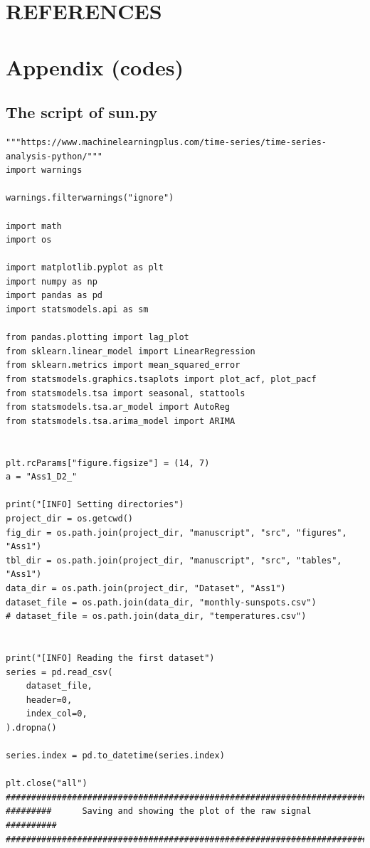 \documentclass[12pt]{article}
\begin{document}
\newpage
\section*{REFERENCES}
\label{sec:sec6}
\printbibliography[heading=none]

%


\newpage
\section*{Appendix (codes)}
\subsection*{The script of sun.py}

\begin{lstlisting}
"""https://www.machinelearningplus.com/time-series/time-series-analysis-python/"""
import warnings

warnings.filterwarnings("ignore")

import math
import os

import matplotlib.pyplot as plt
import numpy as np
import pandas as pd
import statsmodels.api as sm

from pandas.plotting import lag_plot
from sklearn.linear_model import LinearRegression
from sklearn.metrics import mean_squared_error
from statsmodels.graphics.tsaplots import plot_acf, plot_pacf
from statsmodels.tsa import seasonal, stattools
from statsmodels.tsa.ar_model import AutoReg
from statsmodels.tsa.arima_model import ARIMA


plt.rcParams["figure.figsize"] = (14, 7)
a = "Ass1_D2_"

print("[INFO] Setting directories")
project_dir = os.getcwd()
fig_dir = os.path.join(project_dir, "manuscript", "src", "figures", "Ass1")
tbl_dir = os.path.join(project_dir, "manuscript", "src", "tables", "Ass1")
data_dir = os.path.join(project_dir, "Dataset", "Ass1")
dataset_file = os.path.join(data_dir, "monthly-sunspots.csv")
# dataset_file = os.path.join(data_dir, "temperatures.csv")


print("[INFO] Reading the first dataset")
series = pd.read_csv(
    dataset_file,
    header=0,
    index_col=0,
).dropna()

series.index = pd.to_datetime(series.index)

plt.close("all")
############################################################################
#########      Saving and showing the plot of the raw signal      ##########
############################################################################


\end{lstlisting}
\end{document}
